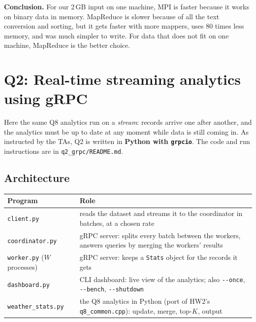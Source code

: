 \documentclass[10pt,a4paper]{article}
\newcommand{\code}[1]{\texttt{#1}}
\begin{document}
\textbf{Conclusion.} For our 2\,GB input on one machine, MPI is faster because it works on binary data in memory. MapReduce
is slower because of all the text conversion and sorting, but it gets faster with more mappers, uses 80 times less memory, and
was much simpler to write. For data that does not fit on one machine, MapReduce is the better choice.

\section{Q2: Real-time streaming analytics using gRPC}

Here the same Q8 analytics run on a \emph{stream}: records arrive one after another, and the analytics must be up to date
at any moment while data is still coming in. As instructed by the TAs, Q2 is written in \textbf{Python with \code{grpcio}}.
The code and run instructions are in \code{q2\_grpc/README.md}.

\subsection{Architecture}
\begin{center}\small
\begin{tabularx}{\textwidth}{>{\raggedright\arraybackslash}p{3.8cm}>{\raggedright\arraybackslash}X}
\toprule
Program & Role \\
\midrule
\code{client.py} & reads the dataset and streams it to the coordinator in batches, at a chosen rate \\
\code{coordinator.py} & gRPC server: splits every batch between the workers, answers queries by merging the workers' results \\
\code{worker.py} ($W$ processes) & gRPC server: keeps a \code{Stats} object for the records it gets \\
\code{dashboard.py} & CLI dashboard: live view of the analytics; also \code{-{}-once}, \code{-{}-bench}, \code{-{}-shutdown} \\
\code{weather\_stats.py} & the Q8 analytics in Python (port of HW2's \code{q8\_common.cpp}): update, merge, top-$K$, output \\
\bottomrule
\end{tabularx}
\end{center}
\end{document}
